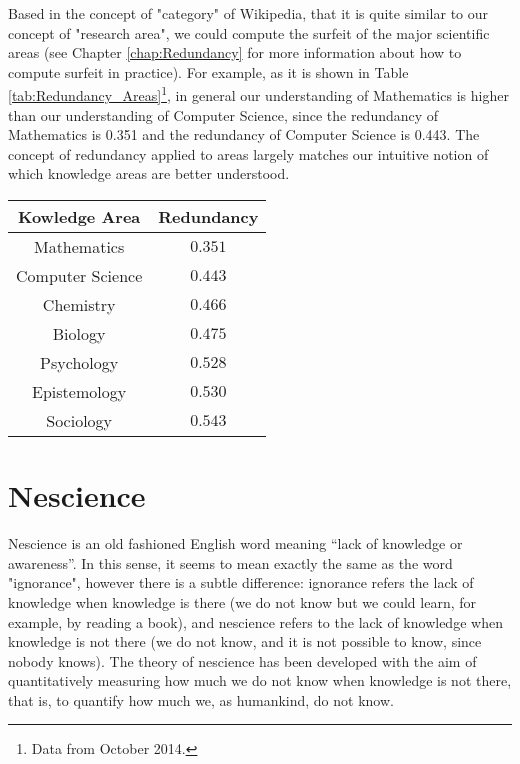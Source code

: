 \begin{example}
Based in the concept of "category" of Wikipedia, that it is quite similar to our concept of "research area", we could compute the surfeit of the major scientific areas (see Chapter \ref{chap:Redundancy} for more information about how to compute surfeit in practice). For example, as it is shown in Table \ref{tab:Redundancy_Areas}\footnote{Data from October 2014.}, in general our understanding of Mathematics is higher than our understanding of Computer Science, since the redundancy of Mathematics is 0.351 and the redundancy of Computer Science is 0.443. The concept of redundancy applied to areas largely matches our intuitive notion of which knowledge areas are better understood.
\end{example}

\begin{table*}
\begin{centering}
\begin{tabular}{|c|c|}
\hline 
Kowledge Area & Redundancy \tabularnewline
\hline 
\hline 
Mathematics & $0.351$ \tabularnewline
\hline 
Computer Science & $0.443$ \tabularnewline
\hline 
Chemistry & $0.466$ \tabularnewline
\hline 
Biology & $0.475$ \tabularnewline
\hline 
Psychology & $0.528$ \tabularnewline
\hline 
Epistemology & $0.530$ \tabularnewline
\hline 
Sociology & $0.543$ \tabularnewline
\hline 
\end{tabular}
\par\end{centering}
\caption{\label{tab:Redundancy_Areas}Redundancy of Scientific Areas}
\end{table*}

%
%

\section{Nescience}
\label{sec:ch1_nescience}

Nescience is an old fashioned English word meaning “lack of knowledge or awareness”. In this sense, it seems to mean exactly the same as the word "ignorance", however there is a subtle difference: ignorance refers the lack of knowledge when knowledge is there (we do not know but we could learn, for example, by reading a book), and nescience refers to the lack of knowledge when knowledge is not there (we do not know, and it is not possible to know, since nobody knows). The theory of nescience has been developed with the aim of quantitatively measuring how much we do not know when knowledge is not there, that is, to quantify how much we, as humankind, do not know.

